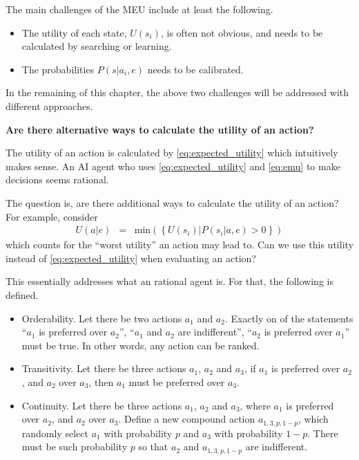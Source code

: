 The main challenges of the MEU include at least the following.
\begin{itemize}
	\item The utility of each state, $U(s_i)$, is often not obvious, and needs to be calculated by searching or learning.
	\item The probabilities $P(s|a_i,e)$ needs to be calibrated.
\end{itemize}
In the remaining of this chapter, the above two challenges will be addressed with different approaches.

\begin{mdframed}
\noindent \textbf{Are there alternative ways to calculate the utility of an action?}

The utility of an action is calculated by \eqref{eq:expected_utility} which intuitively makes sense. An AI agent who uses \eqref{eq:expected_utility} and \eqref{eq:emu} to make decisions seems rational. 

The question is, are there additional ways to calculate the utility of an action? For example, consider
\begin{eqnarray}
	U(a|e) &=& \mathrm{min}\left(\left\{U(s_i)|P(s_i|a,e) > 0\right\}\right) \nonumber
\end{eqnarray}
which counts for the ``worst utility'' an action may lead to. Can we use this utility instead of \eqref{eq:expected_utility} when evaluating an action?

This essentially addresses what an rational agent is. For that, the following  is defined.  
\begin{itemize}
	\item Orderability. Let there be two actions $a_1$ and $a_2$. Exactly on of the statements ``$a_1$ is preferred over $a_2$'', ``$a_1$ and $a_2$ are indifferent'', ``$a_2$ is preferred over $a_1$'' must be true. In other words, any action can be ranked.
	
	\item Transitivity. Let there be three actions $a_1$, $a_2$ and $a_3$, if $a_1$ is preferred over $a_2$, and $a_2$ over $a_3$, then $a_1$ must be preferred over $a_3$.
	
	\item Continuity. Let there be three actions $a_1$, $a_2$ and $a_3$, where $a_1$ is preferred over $a_2$, and $a_2$ over $a_3$. Define a new compound action $a_{1,3, p, 1-p}$, which randomly select $a_1$ with probability $p$ and $a_3$ with probability $1-p$. There must be such probability $p$ so that $a_2$ and $a_{1,3,p,1-p}$ are indifferent.
	

\end{itemize}
\end{mdframed}
